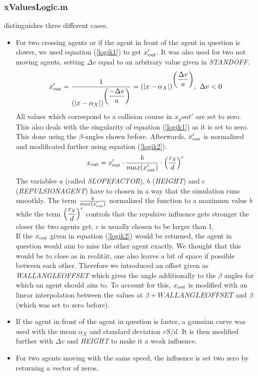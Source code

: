 \subsubsection{xValuesLogic.m}
 distinguishes three different cases.
\begin{itemize}
	\item For two crossing agents or if the agent in front of the agent in question is slower, we used equation (\ref{logik1}) to get $x_{\text{out}}'$. It was also used for two not moving agents, setting $\Delta v$ equal to an arbitrary value given in \textit{STANDOFF}.
	\begin{equation}\label{logik1}
		x_{\text{out}}' = \frac{1}{\displaystyle (|x - \alpha_X|)^{\displaystyle \left(\frac{-\Delta v}{a}\right)}} = (|x - \alpha_X|)^{\displaystyle \left(\frac{\Delta v}{a}\right)},\ \Delta v < 0
	\end{equation}
	\noi All values which correspond to a collision course in $x_y{out}'$ are set to zero. This also deals with the singularity of equation (\ref{logik1}) as it is set to zero. This done using the $\beta$-angles shown before. Afterwards, $x_{\text{out}}'$ is normalized and modificated further using equation (\ref{logik2}).
	\begin{equation}\label{logik2}
		x_{\text{out}} = x_{\text{out}}' \cdot \frac{b}{max(x_{\text{out}}')} \cdot \displaystyle \left(\frac{r_S}{d}\right)^c
	\end{equation}
	\noi The variables $a$ (called \textit{SLOPEFACTOR}), $b$ (\textit{HEIGHT}) and $c$ (\textit{REPULSIONAGENT}) have to chosen in a way that the simulation runs smoothly. The term $\frac{b}{max(x_{\text{out}}')}$ normalized the function to a maximum value $b$ while the term $\displaystyle \left(\frac{r_S}{d}\right)^c$ controls that the repulsive influence gets stronger the closer the two agents get. $c$ is usually chosen to be larger than 1.\\
	
	\noi If the $x_{\text{out}}$ given in equation (\ref{logik2}) would be returned, the agent in question would aim to miss the other agent exactly. We thought that this would be to close as in realität, one also leaves a bit of space if possible between each other. Therefore we introduced an offset given as \textit{WALLANGLEOFFSET} which gives the angle additionally to the $\beta$ angles for which an agent should aim to. To account for this, $x_{\text{out}}$ is modified with an linear interpolation between the values at $\beta + WALLANGLEOFFSET$ and $\beta$ (which was set to zero before).

	\item If the agent in front of the agent in question is faster, a gaussian curve was used with the mean $\alpha_X$ and standard deviation $rS/d$. It is then modified further with $\Delta v$ and \textit{HEIGHT} to make it a weak influence.
	\item For two agents moving with the same speed, the influence is set two zero by returning a vector of zeros.
\end{itemize}


